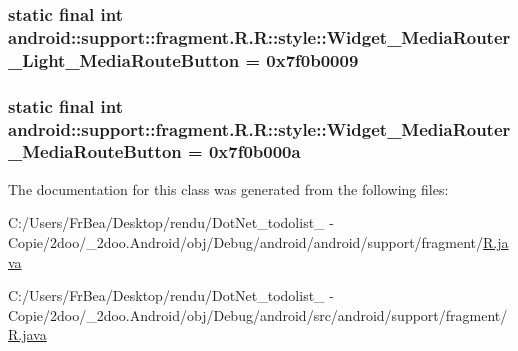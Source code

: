 \hypertarget{classandroid_1_1support_1_1fragment_1_1_r_1_1style_3dd0a54518b9f3ad97e28936e6d62c32}{
\subsubsection[{Widget\_\-MediaRouter\_\-Light\_\-MediaRouteButton}]{\setlength{\rightskip}{0pt plus 5cm}static final int android::support::fragment.R.R::style::Widget\_\-MediaRouter\_\-Light\_\-MediaRouteButton = 0x7f0b0009}}
\label{classandroid_1_1support_1_1fragment_1_1_r_1_1style_3dd0a54518b9f3ad97e28936e6d62c32}


\hypertarget{classandroid_1_1support_1_1fragment_1_1_r_1_1style_fabb48c15f59684b2c207d258158eb82}{
\subsubsection[{Widget\_\-MediaRouter\_\-MediaRouteButton}]{\setlength{\rightskip}{0pt plus 5cm}static final int android::support::fragment.R.R::style::Widget\_\-MediaRouter\_\-MediaRouteButton = 0x7f0b000a}}
\label{classandroid_1_1support_1_1fragment_1_1_r_1_1style_fabb48c15f59684b2c207d258158eb82}




The documentation for this class was generated from the following files:\begin{CompactItemize}
\item 
C:/Users/FrBea/Desktop/rendu/DotNet\_\-todolist\_ - Copie/2doo/\_\-2doo.Android/obj/Debug/android/android/support/fragment/\hyperlink{android_2support_2fragment_2_r_8java}{R.java}\item 
C:/Users/FrBea/Desktop/rendu/DotNet\_\-todolist\_ - Copie/2doo/\_\-2doo.Android/obj/Debug/android/src/android/support/fragment/\hyperlink{src_2android_2support_2fragment_2_r_8java}{R.java}\end{CompactItemize}
